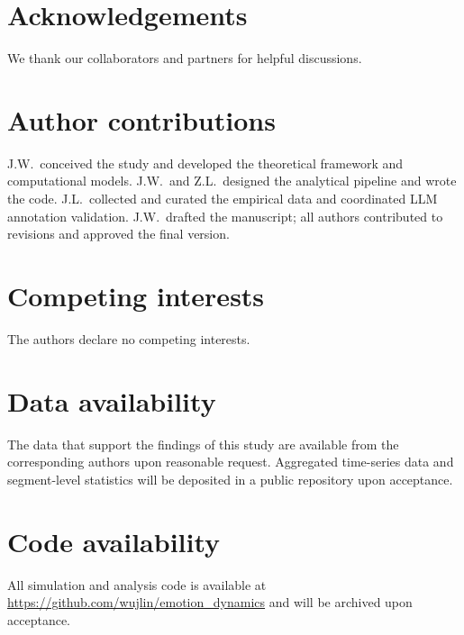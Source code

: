 \documentclass[11pt]{article}
\begin{document}
\FloatBarrier


\section*{Acknowledgements}
We thank our collaborators and partners for helpful discussions.

\section*{Author contributions}
J.W.\ conceived the study and developed the theoretical framework and computational models. J.W.\ and Z.L.\ designed the analytical pipeline and wrote the code. J.L.\ collected and curated the empirical data and coordinated LLM annotation validation. J.W.\ drafted the manuscript; all authors contributed to revisions and approved the final version.

\section*{Competing interests}
The authors declare no competing interests.

\section*{Data availability}
The data that support the findings of this study are available from the corresponding authors upon reasonable request. Aggregated time-series data and segment-level statistics will be deposited in a public repository upon acceptance.

\section*{Code availability}
All simulation and analysis code is available at \url{https://github.com/wujlin/emotion_dynamics} and will be archived upon acceptance.



\end{document}
